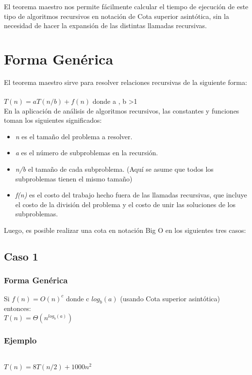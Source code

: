 \documentclass[12pt]{article}
\begin{document}
El teorema maestro nos permite fácilmente calcular el tiempo de ejecución de este tipo de algoritmos recursivos en notación de Cota superior asintótica, sin la necesidad de hacer la expansión de las distintas llamadas recursivas. 
\section{Forma Genérica}
El teorema maestro sirve para resolver relaciones recursivas de la siguiente forma:\\\\ 
$T(n)=a T(n/b)+f(n)$  donde  a , b >1\\

En la aplicación de análisis de algoritmos recursivos, las constantes y funciones toman los siguientes significados: 
\begin{itemize}
    \item \textit{n} es el tamaño del problema a resolver.
    \item \textit{a} es el número de subproblemas en la recursión.
    \item \textit{n/b}  el tamaño de cada subproblema. (Aquí se asume que todos los subproblemas tienen el mismo tamaño)
    \item \textit{f(n)} es el costo del trabajo hecho fuera de las llamadas recursivas, que incluye el costo de la división del problema y el costo de unir las soluciones de los subproblemas.
\end{itemize}

Luego, es posible realizar una cota en notación Big O en los siguientes tres casos: 

\subsection{Caso 1}
\subsubsection{Forma Genérica}
Si $f(n)=O(n)^c$ donde c \< $log_{b}(a)$ (usando Cota superior asintótica) entonces:\\

$T(n)=\Theta(n^{log_{b}(a)})$
\subsubsection{Ejemplo}\\

$T(n)=8T(n/2)+1000n^2$\\
\end{document}
